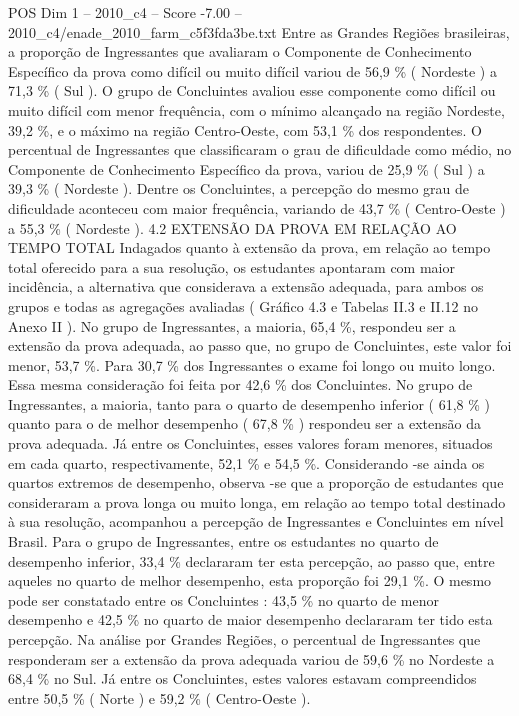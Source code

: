 \begin{textsample}{POS Dim 1 – 2010\_c4 – Score -7.00 – 2010\_c4/enade\_2010\_farm\_c5f3fda3be.txt}
Entre as Grandes Regiões brasileiras, a proporção de Ingressantes que avaliaram o Componente de Conhecimento Específico da prova como difícil ou muito difícil variou de 56,9 \% ( Nordeste ) a 71,3 \% ( Sul ).
O grupo de Concluintes avaliou esse componente como difícil ou muito difícil com menor frequência, com o mínimo alcançado na região Nordeste, 39,2 \%, e o máximo na região Centro-Oeste, com 53,1 \% dos respondentes.
O percentual de Ingressantes que classificaram o grau de dificuldade como médio, no Componente de Conhecimento Específico da prova, variou de 25,9 \% ( Sul ) a 39,3 \% ( Nordeste ).
Dentre os Concluintes, a percepção do mesmo grau de dificuldade aconteceu com maior frequência, variando de 43,7 \% ( Centro-Oeste ) a 55,3 \% ( Nordeste ). 4.2 EXTENSÃO DA PROVA EM RELAÇÃO AO TEMPO TOTAL Indagados quanto à extensão da prova, em relação ao tempo total oferecido para a sua resolução, os estudantes apontaram com maior incidência, a alternativa que considerava a extensão adequada, para ambos os grupos e todas as agregações avaliadas ( Gráfico 4.3 e Tabelas II.3 e II.12 no Anexo II ).
No grupo de Ingressantes, a maioria, 65,4 \%, respondeu ser a extensão da prova adequada, ao passo que, no grupo de Concluintes, este valor foi menor, 53,7 \%.
Para 30,7 \% dos Ingressantes o exame foi longo ou muito longo.
Essa mesma consideração foi feita por 42,6 \% dos Concluintes.
No grupo de Ingressantes, a maioria, tanto para o quarto de desempenho inferior ( 61,8 \% ) quanto para o de melhor desempenho ( 67,8 \% ) respondeu ser a extensão da prova adequada.
Já entre os Concluintes, esses valores foram menores, situados em cada quarto, respectivamente, 52,1 \% e 54,5 \%.
Considerando -se ainda os quartos extremos de desempenho, observa -se que a proporção de estudantes que consideraram a prova longa ou muito longa, em relação ao tempo total destinado à sua resolução, acompanhou a percepção de Ingressantes e Concluintes em nível Brasil.
Para o grupo de Ingressantes, entre os estudantes no quarto de desempenho inferior, 33,4 \% declararam ter esta percepção, ao passo que, entre aqueles no quarto de melhor desempenho, esta proporção foi 29,1 \%.
O mesmo pode ser constatado entre os Concluintes : 43,5 \% no quarto de menor desempenho e 42,5 \% no quarto de maior desempenho declararam ter tido esta percepção.
Na análise por Grandes Regiões, o percentual de Ingressantes que responderam ser a extensão da prova adequada variou de 59,6 \% no Nordeste a 68,4 \% no Sul.
Já entre os Concluintes, estes valores estavam compreendidos entre 50,5 \% ( Norte ) e 59,2 \% ( Centro-Oeste ).

\end{textsample}

